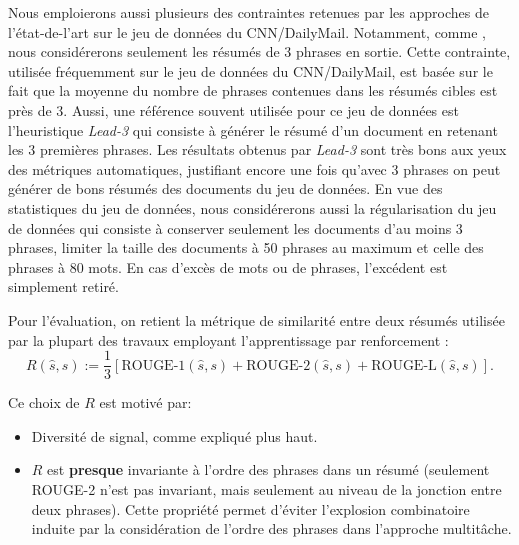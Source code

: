 Nous emploierons aussi plusieurs des contraintes retenues par les approches
de l'état-de-l'art sur le jeu de données du CNN/DailyMail.
Notamment, comme \citep{dong2018banditsum}, nous considérerons seulement les résumés
de 3 phrases en sortie.
Cette contrainte, utilisée fréquemment sur le jeu de données du CNN/DailyMail,
est basée sur le fait que la moyenne du nombre de phrases contenues dans les résumés cibles
est près de 3.
Aussi, une référence souvent utilisée pour ce jeu de données est l'heuristique \textit{Lead-3} \citep{10.5555/3298483.3298681}
qui consiste à générer le résumé d'un document en retenant les 3 premières phrases.
Les résultats obtenus par \textit{Lead-3} sont très bons aux yeux des métriques automatiques,
justifiant encore une fois qu'avec 3 phrases on peut générer de bons résumés des documents du jeu
de données.
En vue des statistiques du jeu de données, nous considérerons aussi la régularisation du jeu de données
qui consiste à conserver seulement les documents d'au moins 3 phrases, limiter la taille des documents à
50 phrases au maximum et celle des phrases à 80 mots.
En cas d'excès de mots ou de phrases, l'excédent est simplement retiré.

Pour l'évaluation, on retient la métrique de similarité entre deux résumés
utilisée par la plupart des travaux employant l'apprentissage par renforcement \citep{dong2018banditsum,luo-etal-2019-reading}:
\begin{equation}
    \label{eq:ROUGE}
    R(\hat{s}, s) := \frac{1}{3} \left[ \text{ROUGE-1}(\hat{s}, s) + \text{ROUGE-2}(\hat{s}, s) + \text{ROUGE-L}(\hat{s}, s) \right].
\end{equation}

Ce choix de $R$ est motivé par:

\begin{itemize}
    \item Diversité de signal, comme expliqué plus haut.
    \item $R$ est \textbf{presque} invariante à l'ordre des phrases dans un résumé (seulement ROUGE-2
          n'est pas invariant, mais seulement au niveau de la jonction entre deux phrases). Cette propriété
          permet d'éviter l'explosion combinatoire induite par la considération de l'ordre des phrases dans l'approche
          multitâche.
\end{itemize}
